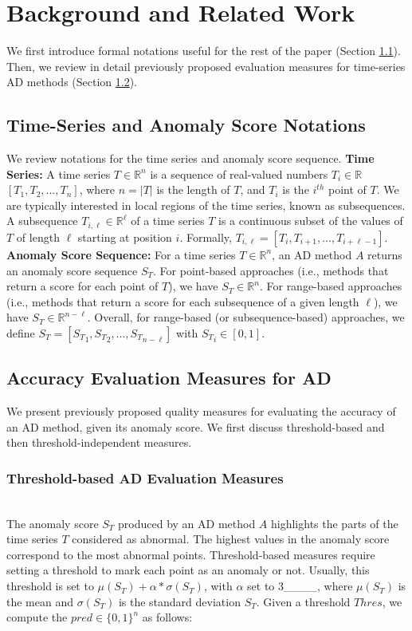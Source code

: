 \section{Background and Related Work}
\label{sec:background}

We first introduce formal notations useful for the rest of the paper (Section \ref{sec:notation}). Then, we review in detail previously proposed evaluation measures for time-series AD methods (Section \ref{acc_measure}). 


\subsection{Time-Series and Anomaly Score Notations}
\label{sec:notation}
We review notations for the time series and anomaly score sequence.
\newline \textbf{Time Series: } A time series $T \in \mathbb{R}^n $ is a sequence of real-valued numbers $T_i\in\mathbb{R}$ $[T_1,T_2,...,T_n]$, where $n=|T|$ is the length of $T$, and $T_i$ is the $i^{th}$ point of $T$. We are typically interested in local regions of the time series, known as subsequences. A subsequence $T_{i,\ell} \in \mathbb{R}^\ell$ of a time series $T$ is a continuous subset of the values of $T$ of length $\ell$ starting at position $i$. Formally, $T_{i,\ell} = [T_i, T_{i+1},...,T_{i+\ell-1}]$.	
\newline \textbf{Anomaly Score Sequence: } For a time series $T \in \mathbb{R}^n $, an AD method $A$ returns an anomaly score sequence $S_T$. For point-based approaches (i.e., methods that return a score for each point of $T$), we have $S_T \in \mathbb{R}^n$. For range-based approaches (i.e., methods that return a score for each subsequence of a given length $\ell$), we have $S_T \in \mathbb{R}^{n-\ell}$. Overall, for range-based (or subsequence-based) approaches, we define $S_T = [{S_T}_1,{S_T}_2,...,{S_T}_{n-\ell}]$ with ${S_T}_i \in [0,1]$.


\subsection{Accuracy Evaluation Measures for AD}
\label{acc_measure}

We present previously proposed quality measures for evaluating the accuracy of an AD method, given its anomaly score. We first discuss threshold-based and then threshold-independent measures.

\subsubsection{Threshold-based AD Evaluation Measures} \hfill\\
The anomaly score $S_T$ produced by an AD method $A$ highlights the parts of the time series $T$ considered as abnormal. The highest values in the anomaly score correspond to the most abnormal points. Threshold-based measures require setting a threshold to mark each point as an anomaly or not. Usually, this threshold is set to $\mu(S_T) + \alpha*\sigma(S_T)$, with $\alpha$ set to 3____, where $\mu(S_T)$ is the mean and $\sigma(S_T)$ is the standard deviation $S_T$. Given a threshold $Thres$, we compute the $pred \in \{0,1\}^n$ as follows:


